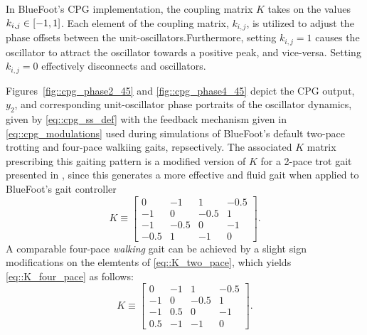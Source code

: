 			In BlueFoot's CPG implementation, the coupling matrix $K$ takes on the values $k_{i,j} \in \left[-1,1\right]$. Each element of the coupling matrix, $k_{i,j}$, is utilized to adjust the phase offsets between the unit-oscillators.Furthermore, setting $k_{i,j}=1$ causes the \Jth oscillator to attract the \Ith oscillator  towards a  positive peak, and vice-versa. Setting $k_{i,j}=0$ effectively disconnects \Ith and \Jth oscillators. 

			Figures~\ref{fig::cpg_phase2_45} and \ref{fig::cpg_phase4_45} depict the CPG output, $y_{2}$, and corresponding unit-oscillator phase portraits of the oscillator dynamics, given by \ref{eq::cpg_ss_def} with the feedback mechanism given in \ref{eq::cpg_modulations} used during simulations of BlueFoot's default two-pace trotting and four-pace walkiing gaits, repsectively. The associated $K$ matrix prescribing this gaiting pattern is a modified version of $K$ for a 2-pace trot gait presented in \cite{Rutishauser2008}, since this generates a more effective and fluid gait when applied to BlueFoot's gait controller
				\begin{equation}
						K\equiv 
						\left[ 
						\begin{array}{cccc}
						 0	   	&	-1   	&	 	 1   	&		-0.5\\
						-1	   	&	 0   	&	 	-0.5   	&		 1 	\\
						-1    	&	-0.5   	&		0    	&	 	-1 	\\
						-0.5	&	 1   	&		-1    	&		 0
						\end{array}
						\right].
						\label{eq::K_two_pace}
				\end{equation}
			A comparable four-pace \emph{walking} gait can be achieved by a slight sign modifications on the elemtents of  \ref{eq::K_two_pace}, which yields \ref{eq::K_four_pace} as follows:
				\begin{equation}
						K\equiv 
						\left[ 
						\begin{array}{cccc}
						 0	   	&	-1   	&	 	 1   	&	  	-0.5\\
						-1	   	&	 0   	&	 	-0.5   	&		 1 	\\
						-1    	&	 0.5   	&		 0    	&	 	-1 	\\
						 0.5	&	-1   	&		-1    	&		 0
						\end{array}
						\right].
						\label{eq::K_four_pace}
				\end{equation}
